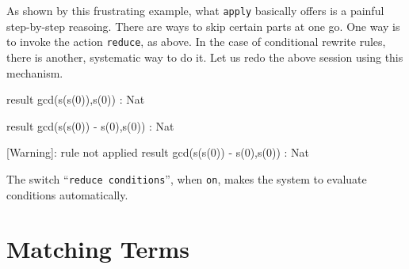\documentclass[a4paper]{memoir}
\begin{document}
As shown by this frustrating example, what \verb|apply| basically
offers is a painful step-by-step reasoing. There are ways to skip
certain parts at one go. One way is to invoke the action \verb|reduce|,
as above. In the case of conditional rewrite rules, there is another,
systematic way to do it. Let us redo the above session using this
mechanism.
\begin{vvtm}
\begin{ccode}


  result gcd(s(s(0)),s(0)) : Nat

  result gcd(s(s(0)) - s(0),s(0)) : Nat


  [Warning]: rule not applied
  result gcd(s(s(0)) - s(0),s(0)) : Nat

\end{ccode}
\end{vvtm}
The switch ``\verb|reduce conditions|'', when \verb|on|, makes the
system to evaluate conditions automatically.

\section{Matching Terms}\label{sec:p2-matching-terms}
\end{document}
